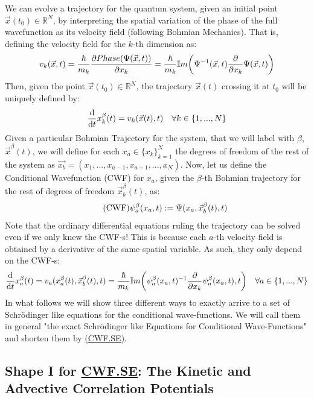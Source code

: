 \documentclass[11pt, a4paper]{article} %
\newcommand{\R}{\mathbb{R}} %
\begin{document}
We can evolve a trajectory for the quantum system, given an initial point $\vec{x}(t_0)\in \R^N$, by interpreting the spatial variation of the phase of the full wavefunction as its velocity field (following Bohmian Mechanics). That is, defining the velocity field for the $k$-th dimension as:
$$
v_k(\vec{x},t) = \frac{\hbar}{m_k}\pdv{ Phase(\Psi(\vec{x},t))}{x_k}=\frac{\hbar}{m_k}\mathbb{I}m\qty(\Psi^{-1}(\vec{x},t)\pdv{}{x_k}\Psi(\vec{x},t))
$$
Then, given the point $\vec{x}(t_0)\in \R^N$, the trajectory $\vec{x}(t)$ crossing it at $t_0$ will be uniquely defined by:
$$
\dv{}{t}x^\beta_k(t)=v_k(\vec{x}(t),t) \quad \forall k\in \{1,...,N\}\vspace{-0.05 cm}
$$
Given a particular Bohmian Trajectory for the system, that we will label with $\beta$, $\vec{x}^\beta(t)$, we will define for each $x_a\in\{x_k\}_{k=1}^N$ the degrees of freedom of the rest of the system as $\vec{x_b}=(x_1,...,x_{a-1},x_{a+1},...,x_N)$. Now, let us define the Conditional Wavefunction (CWF) for $x_a$, given the $\beta$-th Bohmian trajectory for the rest of degrees of freedom $\vec{x}_b^\beta(t)$, as:
\begin{equation}\label{CWF}\tag{CWF}
\psi_a^\beta(x_a,t) := \Psi(x_a, \vec{x}_b^\beta(t), t)\vspace{-0.05 cm}
\end{equation}
Note that the ordinary differential equations ruling the trajectory can be solved even if we only knew the CWF-s! This is because each $a$-th velocity field is obtained by a derivative of the same spatial variable. As such, they only depend on the CWF-s:
$$
\dv{}{t}x^\beta_a(t)=v_a(x_a^\beta (t), \vec{x}^\beta_b(t),t)=\frac{\hbar}{m_k}\mathbb{I}m\qty(\psi_a^\beta(x_a, t)^{-1}\pdv{}{x_k}\psi_a^\beta(x_a, t),t) \quad \forall a\in \{1,...,N\}
$$
In what follows we will show three different ways to exactly arrive to a set of Schrödinger like equations for the conditional wave-functions. We will call them in general "the exact Schrödinger like Equations for Conditional Wave-Functions" and shorten them by \label{CWF.SE}\hyperlink{CWF.SE}{(CWF.SE)}. \vspace{-0.3 cm}

\subsection{Shape I for \hyperref[CWF.SE]{CWF.SE}: The Kinetic and Advective Correlation Potentials}
\end{document}
